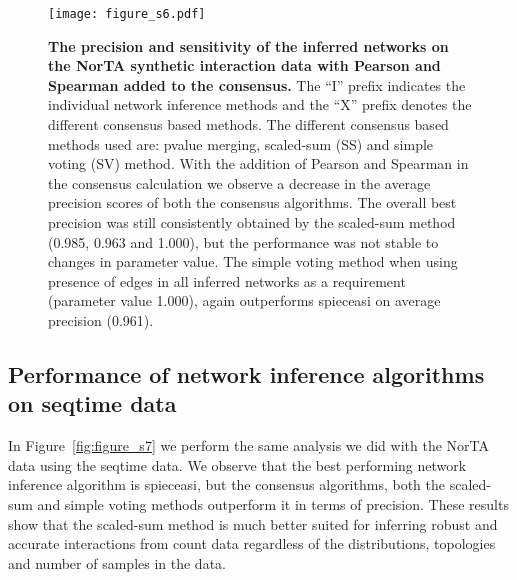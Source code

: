     \begin{figure}[H]
      \centering
      \texttt{[image: figure\_s6.pdf]}
    \end{figure}
    \begin{figure}[H]
      \centering
        \caption{
          \textbf{The precision and sensitivity of the inferred networks on the NorTA synthetic interaction data with Pearson and Spearman added to the consensus.}
            The ``I'' prefix indicates the individual network inference methods and the ``X'' prefix denotes the different consensus based methods.
            The different consensus based methods used are: pvalue merging, scaled-sum (SS) and simple voting (SV) method.
            With the addition of Pearson and Spearman in the consensus calculation we observe a decrease in the average precision scores of both the consensus algorithms.
            The overall best precision was still consistently obtained by the scaled-sum method (0.985, 0.963 and 1.000), but the performance was not stable to changes in parameter value.
            The simple voting method when using presence of edges in all inferred networks as a requirement (parameter value 1.000), again outperforms \ac{spieceasi} on average precision (0.961).
        }
      \label{fig:figure_s6}
    \end{figure}
    \FloatBarrier
    \newpage


  \subsection*{Performance of network inference algorithms on seqtime data}

    In Figure~\ref{fig:figure_s7} we perform the same analysis we did with the NorTA data using the seqtime data.
    We observe that the best performing network inference algorithm is \ac{spieceasi}, but the consensus algorithms, both the scaled-sum and simple voting methods outperform it in terms of precision.
    These results show that the scaled-sum method is much better suited for inferring robust and accurate interactions from count data regardless of the distributions, topologies and number of samples in the data.

